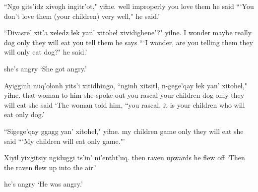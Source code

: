 \documentclass[12pt]{article}
\begin{document}
\gll ``Ngo gits'idz {xivogh ingitr'ot,"} yiɬne.
well improperly {you love them} {he said}
\glt ```You don't love them (your children) very well," he said.'
\glend

\gll ``Divasre' xit'a xeɬedz ɬek yan' xitoheɬ xividighene'?" yiɬne.
{I wonder} maybe really dog only {they will eat} {you tell them} {he says}
\glt ```I wonder, are you telling them they will only eat dog?" he said.'
\glend

{{she's angry}}
\glt `She got angry.'
\glend

\gll Ayigginh nuq'oɬonh yits'i xitidhingo, ``nginh xitsitl, n-gege'qay ɬek yan' xitoheɬ," yiɬne.
that woman {to him} {she spoke out} you rascal {your children} dog only {they will eat} {she said}
\glt `The woman told him, ``you rascal, it is your children who will eat only dog.'
\glend

\gll ``Sigege'qay ggagg yan' xitoheɬ," yiɬne.
{my children} game only {they will eat} {she said}
\glt ```My children will eat only game."'
\glend

\gll Xiyiɬ yixgitsiy {ngiduggi ts'in'} ni'entht'uq. 
then raven upwards {he flew off}
\glt `Then the raven flew up into the air.'
\glend

{{he's angry}}
\glt `He was angry.'
\glend
\end{document}
